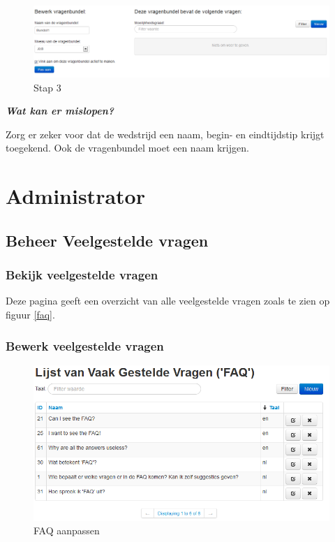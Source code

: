 \documentclass[]{article}
\begin{document}
\begin{figure}[!ht]
	\centering
	\includegraphics[width=1\textwidth]{img/stap3}
	\caption{Stap 3}
	\label{stap3}
\end{figure}

\textbf{\textit{Wat kan er mislopen?}}

Zorg er zeker voor dat de wedstrijd een naam, begin- en eindtijdstip krijgt toegekend. Ook de vragenbundel moet een naam krijgen.

\section{Administrator}

\subsection{Beheer Veelgestelde vragen}

\subsubsection{Bekijk veelgestelde vragen}
Deze pagina geeft een overzicht van alle veelgestelde vragen zoals te zien op figuur \ref{faq}.

\subsubsection{Bewerk veelgestelde vragen}

\begin{figure}[!ht]
	\centering
	\includegraphics[width=1\textwidth]{img/faqmgmt}
	\caption{FAQ aanpassen}
	\label{faqmgmt}
\end{figure}
\end{document}
